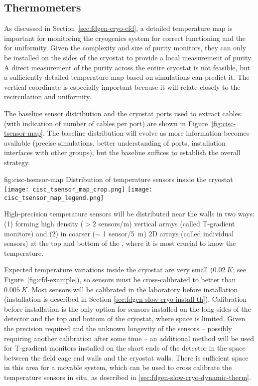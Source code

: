 \subsection{Thermometers}
\label{sec:fdsp-cryo-therm}
As discussed in Section~\ref{sec:fdgen-cryo-cfd}, a detailed \threed temperature map is important for monitoring 
the cryogenics system for correct functioning and the  for uniformity.
Given the complexity and size of purity monitors, they can only be installed on the sides of the cryostat to provide a local measurement of
 purity.  
A direct measurement of the  purity across the entire cryostat is not feasible, but a sufficiently detailed \threed temperature map based on  simulations can predict it. The vertical coordinate is especially important because it will relate closely to the 
 recirculation and uniformity. 

The baseline sensor distribution and the cryostat ports used to extract cables (with indication of number of cables per port) are shown in Figure~\ref{fig:cisc-tsensor-map}. The baseline distribution will evolve as more information becomes available (precise  simulations, better understanding of  ports, installation interfaces with other groups), but the baseline suffices to establish the overall strategy.

\begin{dunefigure}{fig:cisc-tsensor-map}
  {Distribution of temperature sensors inside the cryostat}
  \texttt{[image: cisc\_tsensor\_map\_crop.png]}
  \texttt{[image: cisc\_tsensor\_map\_legend.png]}
\end{dunefigure}

High-precision temperature sensors will be distributed near the  walls in two ways:
(1) forming high density (\(>2\) sensors/\si{m}) vertical arrays %
(called T-gradient monitors) and (2) in coarser ($\sim$ 1 sensor/\SI{5}{m}) 2D arrays %
(called individual sensors) at the top and bottom of the , where it is most crucial to know the temperature.

Expected temperature variations inside the cryostat are very small ($\SI{0.02}{K}$; see Figure~\ref{fig:cfd-example}),
so sensors must be cross-calibrated to better than $\SI{0.005}{K}$. Most sensors will be calibrated in the laboratory before installation
(installation is described in Section \ref{sec:fdgen-slow-cryo-install-th}).
Calibration before installation is the only option for sensors installed on the long sides of the detector and the top and bottom of the cryostat, where space is limited.
Given the precision required and the unknown longevity of the sensors -- possibly requiring another  calibration after some time -- an additional method
will be used for T-gradient monitors installed on the short ends of the detector in the space between the field cage end walls and the cryostat walls. There is sufficient space in this area for a movable system, which can be used to cross calibrate
the temperature sensors in situ, as described in \ref{sec:fdgen-slow-cryo-dynamic-therm}.

